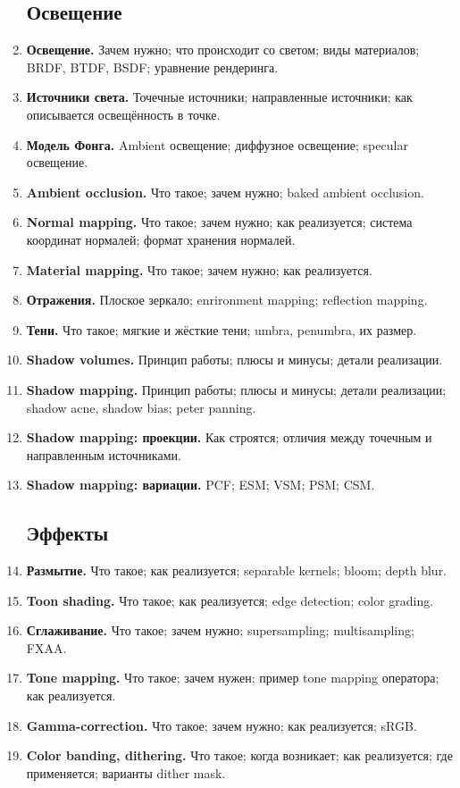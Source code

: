 \documentclass{article}
\begin{document}
\begin{enumerate}
\subsection{Освещение}
\item \textbf{Освещение.} Зачем нужно; что происходит со светом; виды материалов; BRDF, BTDF, BSDF; уравнение рендеринга.
\item \textbf{Источники света.} Точечные источники; направленные источники; как описывается освещённость в точке.
\item \textbf{Модель Фонга.} Ambient освещение; диффузное освещение; specular освещение.
\item \textbf{Ambient occlusion.} Что такое; зачем нужно; baked ambient occlusion.
\item \textbf{Normal mapping.} Что такое; зачем нужно; как реализуется; система координат нормалей; формат хранения нормалей.
\item \textbf{Material mapping.} Что такое; зачем нужно; как реализуется.
\item \textbf{Отражения.} Плоское зеркало; enrironment mapping; reflection mapping.
\item \textbf{Тени.} Что такое; мягкие и жёсткие тени; umbra, penumbra, их размер.
\item \textbf{Shadow volumes.} Принцип работы; плюсы и минусы; детали реализации.
\item \textbf{Shadow mapping.} Принцип работы; плюсы и минусы; детали реализации; shadow acne, shadow bias; peter panning.
\item \textbf{Shadow mapping: проекции.} Как строятся; отличия между точечным и направленным источниками.
\item \textbf{Shadow mapping: вариации.} PCF; ESM; VSM; PSM; CSM.

\subsection{Эффекты}
\item \textbf{Размытие.} Что такое; как реализуется; separable kernels; bloom; depth blur.
\item \textbf{Toon shading.} Что такое; как реализуется; edge detection; color grading.
\item \textbf{Сглаживание.} Что такое; зачем нужно; supersampling; multisampling; FXAA.
\item \textbf{Tone mapping.} Что такое; зачем нужен; пример tone mapping оператора; как реализуется.
\item \textbf{Gamma-correction.} Что такое; зачем нужно; как реализуется; sRGB.
\item \textbf{Color banding, dithering.} Что такое; когда возникает; как реализуется; где применяется; варианты dither mask.


\end{enumerate}
\end{document}
